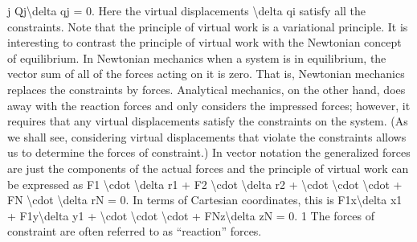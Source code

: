 j
Qj\textbackslash{}delta qj = 0.
Here the virtual displacements \textbackslash{}delta qi satisfy all the constraints. Note that the
principle of virtual work is a variational principle.
It is interesting to contrast the principle of virtual work with the Newtonian
concept of equilibrium. In Newtonian mechanics when a system is in equilibrium, the vector sum of all of the forces acting on it is zero. That is, Newtonian mechanics replaces the constraints by forces. Analytical mechanics, on
the other hand, does away with the reaction forces and only considers the
impressed forces; however, it requires that any virtual displacements satisfy the
constraints on the system. (As we shall see, considering virtual displacements
that violate the constraints allows us to determine the forces of constraint.)
In vector notation the generalized forces are just the components of the
actual forces and the principle of virtual work can be expressed as
F1 \textbackslash{}cdot  \textbackslash{}delta r1 + F2 \textbackslash{}cdot  \textbackslash{}delta r2 + \textbackslash{}cdot  \textbackslash{}cdot  \textbackslash{}cdot  + FN \textbackslash{}cdot  \textbackslash{}delta rN = 0.
In terms of Cartesian coordinates, this is
F1x\textbackslash{}delta x1 + F1y\textbackslash{}delta y1 + \textbackslash{}cdot  \textbackslash{}cdot  \textbackslash{}cdot  + FNz\textbackslash{}delta zN = 0.
1 The forces of constraint are often referred to as ``reaction'' forces.

